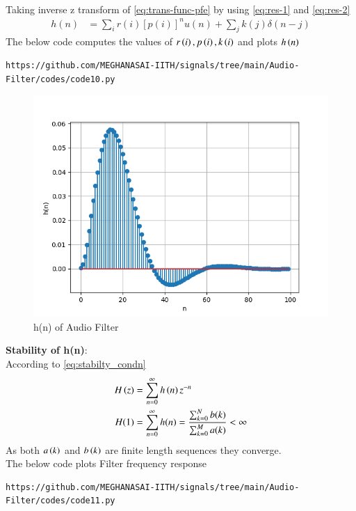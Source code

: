 \documentclass[journal,12pt,twocolumn]{IEEEtran}
\theoremstyle{remark}
\begin{document}
\begin{enumerate}[label=\thesection.\arabic*,ref=\thesection.\theenumi]
\begin{align}
\end{align}
Taking inverse z transform of \eqref{eq:trans-func-pfe} by using \eqref{eq:res-1} and \eqref{eq:res-2}
\begin{align}
h(n) &= \sum_{i}r(i)[p(i)]^nu(n) + \sum_{j}k(j)\delta(n - j)
	\label{eq:h-n-expr}
\end{align}
The below code computes the values of $r\left(i\right),p\left(i\right) , k\left(i\right)$ and plots $h\left(n\right)$
\begin{lstlisting}
https://github.com/MEGHANASAI-IITH/signals/tree/main/Audio-Filter/codes/code10.py
\end{lstlisting}

\begin{figure}[H]
\centering
\includegraphics[width=\columnwidth]{figs/h(n)_6.2.png}
\caption{h(n) of Audio Filter}
\label{fig:6.2_hn}
\end{figure}
\textbf{Stability of h(n)}:\\
According to \eqref{eq:stabilty_condn}
\begin{align}
H\left(z\right) &= \sum_{n = 0}^{\infty} h\left(n\right)z^{-n}\\
H(1)&= \sum_{n = 0}^{\infty}h(n)  = \frac{\sum_{k = 0}^{N}b(k)}{\sum_{k = 0}^{M}a(k)}< \infty
\end{align}
As both $a\left(k\right)$ and $b\left(k\right)$ are finite length sequences they converge.\\
The below code plots Filter frequency response
\begin{lstlisting}
https://github.com/MEGHANASAI-IITH/signals/tree/main/Audio-Filter/codes/code11.py
\end{lstlisting}
\begin{figure}[H]

\end{figure}
\end{enumerate}
\end{document}
